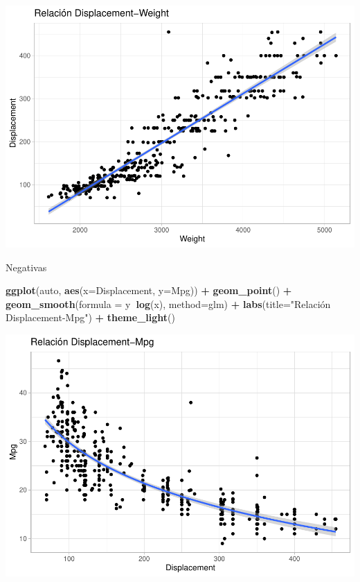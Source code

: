 \documentclass[
]{article}
\newenvironment{Shaded}{\begin{snugshade}}{\end{snugshade}}
\newcommand{\DataTypeTok}[1]{\textcolor[rgb]{0.13,0.29,0.53}{#1}}
\newcommand{\KeywordTok}[1]{\textcolor[rgb]{0.13,0.29,0.53}{\textbf{#1}}}
\newcommand{\NormalTok}[1]{#1}
\newcommand{\OperatorTok}[1]{\textcolor[rgb]{0.81,0.36,0.00}{\textbf{#1}}}
\newcommand{\StringTok}[1]{\textcolor[rgb]{0.31,0.60,0.02}{#1}}
\begin{document}
\begin{center}\includegraphics{EDA_files/figure-latex/unnamed-chunk-21-2} \end{center}

Negativas

\begin{Shaded}
\begin{Highlighting}[]
\KeywordTok{ggplot}\NormalTok{(auto, }\KeywordTok{aes}\NormalTok{(}\DataTypeTok{x=}\NormalTok{Displacement, }\DataTypeTok{y=}\NormalTok{Mpg)) }\OperatorTok{+}
\StringTok{  }\KeywordTok{geom_point}\NormalTok{() }\OperatorTok{+}
\StringTok{  }\KeywordTok{geom_smooth}\NormalTok{(}\DataTypeTok{formula =}\NormalTok{ y}\OperatorTok{~}\KeywordTok{log}\NormalTok{(x), }\DataTypeTok{method=}\NormalTok{glm) }\OperatorTok{+}
\StringTok{  }\KeywordTok{labs}\NormalTok{(}\DataTypeTok{title=}\StringTok{"Relación Displacement-Mpg"}\NormalTok{) }\OperatorTok{+}
\StringTok{  }\KeywordTok{theme_light}\NormalTok{()}
\end{Highlighting}
\end{Shaded}

\begin{center}\includegraphics{EDA_files/figure-latex/unnamed-chunk-22-1} \end{center}
\end{document}
